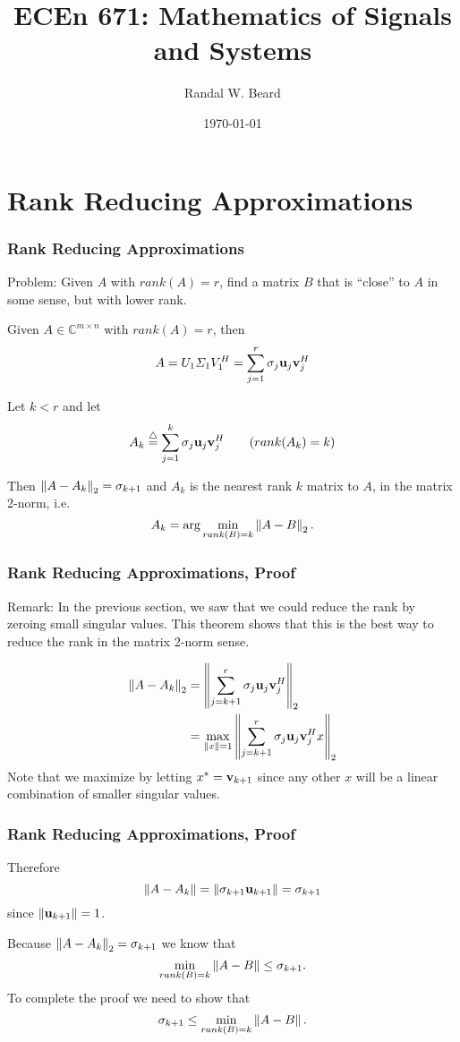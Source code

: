 \documentclass{beamer}
\title{ECEn 671: Mathematics of Signals and Systems}
\author{Randal W. Beard}
\institute{Brigham Young University}
\date{\today}
\begin{document}
\begin{frame}
	\titlepage
\end{frame}


\section{Rank Reducing Approximations}
\frame{\sectionpage}

\begin{frame}\frametitle{Rank Reducing Approximations}
	{\color{blue}Problem:}  Given $A$ with $rank(A) = r$, find a matrix $B$ that is ``close'' to $A$ in some sense, but with lower rank.	
	
	\begin{theorem}	
		Given $A \in \mathbb{C}^{m\times n}$ with $rank(A)=r$, then
		\[
			A = U_1\Sigma_1V_1^H = \sum_{j=1}^r \sigma_j\mathbf{u}_j\mathbf{v}_j^H
		\]
		
		Let $k < r$ and let 
		\[ 
			A_k \stackrel{\triangle}{=} \sum_{j=1}^k\sigma_j\mathbf{u}_j\mathbf{v}_j^H \qquad (rank(A_k) = k) 
		\]
		
		Then $\left\|A-A_k\right\|_2 = \sigma_{k+1}$ and $A_k$ is the nearest rank $k$ matrix to $A$, in the matrix 2-norm, i.e.
		\[ 
			A_k = \arg\min_{rank(B)=k} \left\|A-B \right\|_2.
		\]
	\end{theorem}
\end{frame}

\begin{frame}\frametitle{Rank Reducing Approximations, Proof}
	{\color{blue}Remark:} In the previous section, we saw that we could reduce the rank by zeroing small singular values.  This theorem shows that this is the best way to reduce the rank in the matrix 2-norm sense.	

	\begin{proofstart}
		\begin{align*}
			\left\|A-A_k \right\|_2 
				&= \left\|\sum_{j=k+1}^r\sigma_j\mathbf{u}_j\mathbf{v}_j^H \right\|_2 \\
				&= \max_{\left\|x \right\|=1}\left\|\sum_{j=k+1}^r\sigma_j\mathbf{u}_j\mathbf{v}_j^Hx \right\|_2
		\end{align*}
		Note that we maximize by letting $x^\ast = \mathbf{v}_{k+1}$ since any other $x$ will be a linear combination of smaller singular values.	
	\end{proofstart}
\end{frame}

\begin{frame}\frametitle{Rank Reducing Approximations, Proof}
	Therefore
	\[ 
		\left\|A-A_k\right\| = \left\|\sigma_{k+1 }\mathbf{u}_{k+1}\right\| = \sigma_{k+1} 
	\]
	since $\left\|\mathbf{u}_{k+1}\right\| = 1$.
	
	\vfill
	
	Because $\left\|A-A_k \right\|_2 = \sigma_{k+1}$ we know that
	\[ 
		\min_{rank(B)=k}\left\|A-B \right\| \leq \sigma_{k+1}.
	\]
	To complete the proof we need to show that
	\[ 
		\sigma_{k+1} \leq \min_{rank(B)=k}\left\|A-B \right\|.
	\]	
\end{frame}
\end{document}
